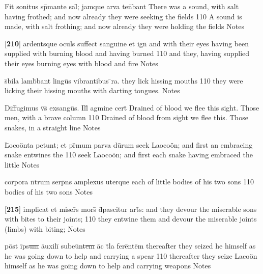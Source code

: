\latline
  {Fit sonitus sp\={}mante sal\={}; jamque arva ten\={}bant }
	{ There was a sound, with salt having frothed; and now already they were seeking the fields }
  {110}
  { A sound is made, with salt frothing; and now already they were holding the fields }
  { Notes }


\latline
  {[\textbf{210}] ardent\={\macron {\i}}sque ocul\={}s suffect\={\macron {\i}} sanguine et ign\={\macron {\i}}}
	{ and with their eyes having been supplied with burning blood and having burned  }
  {110}
  { and they, having supplied their eyes burning eyes with blood and fire  }
  { Notes }


\latline
  {s\={\macron {\i}}bila lamb\={}bant lingu\={\macron {\i}}s vibrantibus \={}ra.}
  { they lick hissing mouths  }
  {110}
  { they were licking their hissing mouths with darting tongues.  }
  { Notes }


\latline
  {Diffugimus v\={\macron {\i}}s\={} exsangu\={}s.  Ill\={\macron {\i}} agmine cert\={}}
	{ Drained of blood we flee this sight.  Those men, with a brave column }
  {110}
  { Drained of blood from sight we flee this.  Those snakes, in a straight line }
  { Notes }


\latline
  {L\={}oco\"{o}nta petunt; et pr\={\macron {\i}}mum parva du\={}rum}
	{ seek Laoco\"on; and first an embracing snake entwines the  }
  {110}
  { seek Laoco\"on; and first each snake having embraced the little   }   
  { Notes }


\latline
  {corpora n\={}t\={}rum serp\={}ns amplexus uterque}
	{ each of little bodies of his two sons }
  {110}
  { bodies of his two sons }                                    
  { Notes }


\latline
  {[\textbf{215}] implicat et miser\={}s mors\={} d\={}pascitur art\={}s:}
	{ and they devour the miserable sons with bites to their joints; }
  {110}
	{ they entwine them and devour the miserable joints (limbs) with biting; }
  { Notes }


\latline
  {p\=ost \=ips\sout{um }\={au}x\-il\-i\={} s\-ub\-e\=unt\sout{em }\=ac t\={}l\-a f\-er\=ent\=em}
	{ thereafter they seized he himself as he was going down to help and carrying a spear }
  {110}
	{ thereafter they seize Laco\"on himself as he was going down to help and carrying weapons }
  { Notes }


